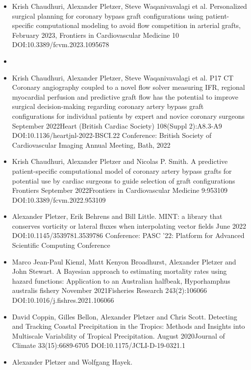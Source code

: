 \documentclass[10pt,a4paper]{altacv}
\begin{document}
\divider
\medskip


  \begin{itemize}
    \item Krish Chaudhuri, Alexander Pletzer, Steve Waqanivavalagi et al.
Personalized surgical planning for coronary bypass graft configurations using patient-specific computational modeling to avoid flow competition in arterial grafts, February 2023, Frontiers in Cardiovascular Medicine 10
DOI:10.3389/fcvm.2023.1095678
\item 
    \item Krish Chaudhuri, Alexander Pletzer, Steve Waqanivavalagi et al. P17 CT Coronary angiography coupled to a novel flow solver measuring IFR, regional myocardial perfusion and predictive graft flow has the potential to improve surgical decision-making regarding coronary artery bypass graft configurations for individual patients by expert and novice coronary surgeons
September 2022Heart (British Cardiac Society) 108(Suppl 2):A8.3-A9
DOI:10.1136/heartjnl-2022-BSCI.22
Conference: British Society of Cardiovascular Imaging Annual Meeting, Bath, 2022
    \item Krish Chaudhuri, Alexander Pletzer and Nicolas P. Smith. A predictive patient-specific computational model of coronary artery bypass grafts for potential use by cardiac surgeons to guide selection of graft configurations
 Frontiers
September 2022Frontiers in Cardiovascular Medicine 9:953109
DOI:10.3389/fcvm.2022.953109
    \item Alexander Pletzer, Erik Behrens and Bill Little. MINT: a library that conserves vorticity or lateral fluxes when interpolating vector fields
June 2022
DOI:10.1145/3539781.3539786
Conference: PASC '22: Platform for Advanced Scientific Computing Conference
    \item Marco Jean-Paul Kienzl, Matt Kenyon Broadhurst, Alexander Pletzer and John Stewart. A Bayesian approach to estimating mortality rates using hazard functions: Application to an Australian halfbeak, Hyporhamphus australis fishery
November 2021Fisheries Research 243(2):106066
DOI:10.1016/j.fishres.2021.106066
   \item David Coppin, Gilles Bellon, Alexander Pletzer and Chris Scott.
Detecting and Tracking Coastal Precipitation in the Tropics: Methods and Insights into Multiscale Variability of Tropical Precipitation. August 2020Journal of Climate 33(15):6689-6705
DOI:10.1175/JCLI-D-19-0321.1
   \item Alexander Pletzer and Wolfgang Hayek.

\end{itemize}
\end{document}

